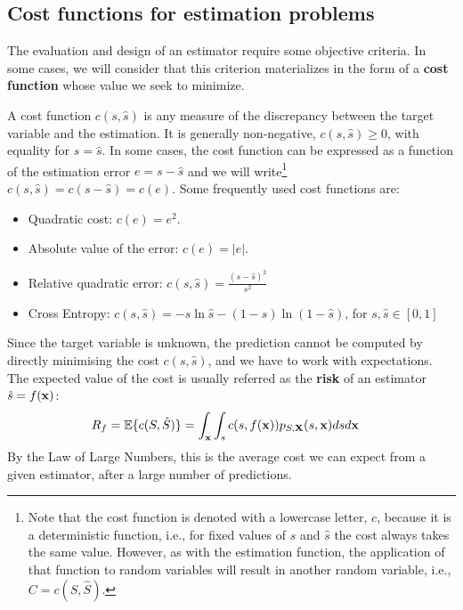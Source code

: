\subsection{Cost functions for estimation problems}
\label{subsec_funcion_coste}

The evaluation and design of an estimator require some objective criteria. In some cases, we will consider that this criterion materializes in the form of a {\bf cost function} whose value we seek to minimize. %

A cost function $c(s,\hat s)$ is any measure of the discrepancy between the target variable and the estimation. It is generally non-negative, $c(s,\hat s) \geq 0$, with equality for $s = \hat s$. In some cases, the cost function can be expressed as a function of the estimation error $e= s-\hat s$ and we will write\footnote{Note that the cost function is denoted with a lowercase letter, $c$, because it is a deterministic function, i.e., for fixed values of $s$ and $\hat s$ the cost always takes the same value. However, as with the estimation function, the application of that function to random variables will result in another random variable, i.e., $C = c(S,\hat S)$.} $c(s,\hat s) = c(s - \hat s) = c(e)$. Some frequently used cost functions are:
\begin{itemize}
\item Quadratic cost: $c(e) = e^2$.
\item Absolute value of the error: $c(e) = |e|$.
\item Relative quadratic error: $c(s,\hat s) = \frac{(s-\hat{s})^2}{s^2}$
\item Cross Entropy: $c(s,\hat s) = - s \ln \hat s - (1-s) \ln (1-\hat s)$, for $s,\hat{s}\in [0,1]$
\end{itemize}

Since the target variable is unknown, the prediction cannot be computed by directly minimising the cost $c(s, \hat s)$, and we have to work with expectations. The expected value of the cost is usually referred as the {\bf risk} of an estimator $\hat{s}=f({\bf x})$:
\begin{align}
\label{Est:coste_medio_gen}
R_f = \mathbb{E}\{c(S,\hat S)\} 
    & = \int_{\bf x} \int_s c(s,f({\bf x})) p_{S,{\bf X}}(s,{\bf x}) ds d{\bf x}
\end{align}
By the Law of Large Numbers, this is the average cost we can expect from a given estimator, after a large number of predictions.

